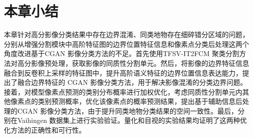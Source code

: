 \section{本章小结}
\label{sec::chap04-6}
本章针对高分影像分类结果中存在边界混淆、同类地物存在细碎错分区域的问题，分别从增强分割模块中高阶特征图的边界位置特征信息和像素点分类后处理这两个角度改进基于CGAN 影像分类方法的不足。首先使用TFSV-IT2FCM 聚类分割方法对高分影像预处理，获取影像的同质性分割单元。然后，将影像的边界特征信息融合到反卷积上采样的特征图中，提升高阶语义特征的边界位置信息表达能力，提出了融合边界特征的 CGAN 影像分类方法，用于解决影像混淆的分类边界问题。接着，对模型像素点预测的类别分布概率进行加权优化，考虑同质性分割单元内其他像素点的类别预测概率，优化该像素点的概率预测结果，提出基于辅助信息后处理的CGAN 影像分类方法，由于提升同类地物分类结果的空间一致性。最后，分别在Vaihingen 数据集上进行实验验证。量化和目视的实验结果均证明了这两种优化方法的正确性和可行性。
